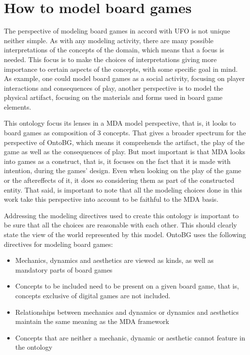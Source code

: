 \section{How to model board games} 

The perspective of modeling board games in accord with UFO is not unique neither simple. As with any modeling activity, there are many possible interpretations of the concepts of the domain, which means that a focus is needed. This focus is to make the choices of interpretations giving more importance to certain aspects of the concepts, with some specific goal in mind. As example, one could model board games as a social activity, focusing on player interactions and consequences of play, another perspective is to model the physical artifact, focusing on the materials and forms used in board game elements.

This ontology focus its lenses in a MDA model perspective, that is, it looks to board games as composition of 3 concepts. That gives a broader spectrum for the perspective of OntoBG, which means it comprehends the artifact, the play of the game as well as the consequences of play. But most important is that MDA looks into games as a construct, that is, it focuses on the fact that it is made with intention, during the games' design. Even when looking on the play of the game or the aftereffects of it, it does so considering them as part of the constructed entity. That said, is important to note that all the modeling choices done in this work take this perspective into account to be faithful to the MDA basis. 



Addressing the modeling directives used to create this ontology is important to be sure that all the choices are reasonable with each other. This should clearly state the view of the world represented by this model. OntoBG uses the following directives for modeling board games:

\begin{itemize}
    \item Mechanics, dynamics and aesthetics are viewed as kinds, as well as mandatory parts of board games
    \item Concepts to be included need to be present on a given board game, that is, concepts exclusive of digital games are not included.
    \item Relationships between mechanics and dynamics or dynamics and aesthetics maintain the same meaning as the MDA framework
    \item Concepts that are neither a mechanic, dynamic or aesthetic cannot feature in the ontology
\end{itemize}

